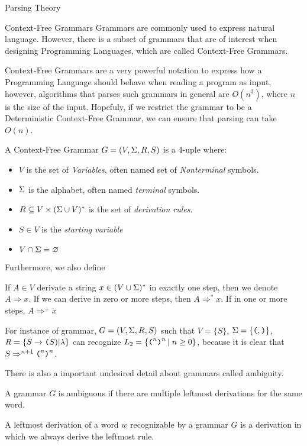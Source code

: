 \begin{section}{Parsing Theory}
\begin{subsection}{Context-Free Grammars}
Grammars are commonly used to express natural language. However, there is
a subset of grammars that are of interest when designing
Programming Languages, which are called Context-Free Grammars.

Context-Free Grammars are a very powerful notation to express how a Programming Language
should behave when reading a program as input, however, algorithms that parses
such grammars in general are $O(n^3)$, where $n$ is the size of the input. Hopefuly,
if we restrict the grammar to be a Deterministic Context-Free Grammar, we can ensure
that parsing can take $O(n)$.

\begin{definition}
A Context-Free Grammar $G = (V, \Sigma, R, S)$ is a 4-uple where:
\begin{itemize}
	\item $V$ is the set of \textit{Variables}, often named set of
	\textit{Nonterminal} symbols.
	\item $\Sigma$ is the alphabet, often named \textit{terminal} symbols.
	\item $R \subseteq V \times (\Sigma \cup V)^*$ is the set of \textit{derivation rules}.
	\item $S \in V$ is the \textit{starting variable}
	\item $V \cap \Sigma = \varnothing$
\end{itemize}
\end{definition}

Furthermore, we also define

\begin{definition}
	If $A \in V$ derivate a string $x \in (V \cup \Sigma)^*$ in exactly one step, then
	we denote $A \Rightarrow x$. If we can derive in zero or more steps, then
	$A \Rightarrow^* x$. If in one or more steps, $A \Rightarrow^+ x$
\end{definition}

For instance of grammar, $G = (V, \Sigma, R, S)$ such that
$V = \{S\}$, $\Sigma = \{\texttt{(}, \texttt{)}\}$, $R = \{S \rightarrow \texttt{(} S{)} | \lambda\}$
can recognize $L_2 = \{\texttt{(}^n \texttt{)}^n\,|\;n \geq 0\}$, because it is clear that
$S \Rightarrow^{n+1} \texttt{(}^n\texttt{)}^n$.

There is also a important undesired detail about grammars called ambiguity.

\begin{definition}
	A grammar $G$ is ambiguous if there are multiple leftmost derivations for the same
	word.
\end{definition}
\begin{definition}
	A leftmost derivation of a word $w$ recognizable by a grammar $G$ is a derivation
	in which we always derive the leftmost rule.
\end{definition}


\end{subsection}
\end{section}
